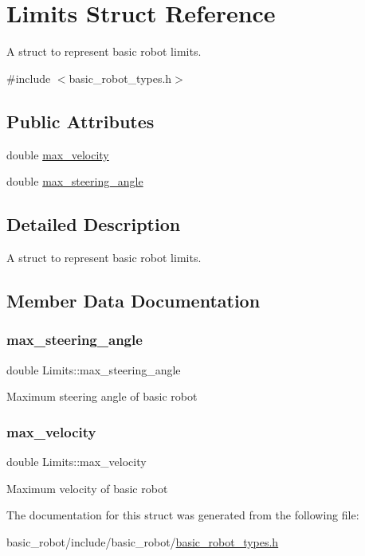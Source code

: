 \hypertarget{structLimits}{}\section{Limits Struct Reference}
\label{structLimits}


A struct to represent basic robot limits.  




{\ttfamily \#include $<$basic\+\_\+robot\+\_\+types.\+h$>$}

\subsection*{Public Attributes}
\begin{DoxyCompactItemize}
\item 
double \hyperlink{structLimits_a4dcddf9e9d4db372e785c3fb0f9a2f32}{max\+\_\+velocity}
\item 
double \hyperlink{structLimits_a9e75f531da82d77fd49ba40d96d654a8}{max\+\_\+steering\+\_\+angle}
\end{DoxyCompactItemize}


\subsection{Detailed Description}
A struct to represent basic robot limits. 

\subsection{Member Data Documentation}
\mbox{\label{structLimits_a9e75f531da82d77fd49ba40d96d654a8}} 
\subsubsection{\texorpdfstring{max\+\_\+steering\+\_\+angle}{max\_steering\_angle}}
{\footnotesize\ttfamily double Limits\+::max\+\_\+steering\+\_\+angle}

Maximum steering angle of basic robot \mbox{\label{structLimits_a4dcddf9e9d4db372e785c3fb0f9a2f32}} 
\subsubsection{\texorpdfstring{max\+\_\+velocity}{max\_velocity}}
{\footnotesize\ttfamily double Limits\+::max\+\_\+velocity}

Maximum velocity of basic robot 

The documentation for this struct was generated from the following file\+:\begin{DoxyCompactItemize}
\item 
basic\+\_\+robot/include/basic\+\_\+robot/\hyperlink{basic__robot__types_8h}{basic\+\_\+robot\+\_\+types.\+h}\end{DoxyCompactItemize}
